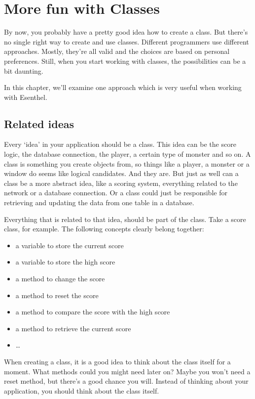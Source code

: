 \chapter{More fun with Classes}

By now, you probably have a pretty good idea how to create a class. But there's no single right way to create and use classes. Different programmers use different approaches. Mostly, they're all valid and the choices are based on personal preferences. Still, when you start working with classes, the possibilities can be a bit daunting.

In this chapter, we'll examine one approach which is very useful when working with Esenthel.  

\section{Related ideas}

Every `idea' in your application should be a class. This idea can be the score logic, the database connection, the player, a certain type of monster and so on. A class is something you create objects from, so things like a player, a monster or a window do seems like logical candidates. And they are. But just as well can a class be a more abstract idea, like a scoring system, everything related to the network or a database connection. Or a class could just be responsible for retrieving and updating the data from one table in a database. 

Everything that is related to that idea, should be part of the class. Take a score class, for example. The following concepts clearly belong together: 

\begin{itemize}
\item a variable to store the current score
\item a variable to store the high score
\item a method to change the score
\item a method to reset the score
\item a method to compare the score with the high score
\item a method to retrieve the current score
\item \ldots
\end{itemize}

When creating a class, it is a good idea to think about the class itself for a moment. What methods could you might need later on? Maybe you won't need a reset method, but there's a good chance you will. Instead of thinking about your application, you should think about the class itself.

